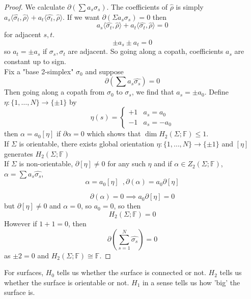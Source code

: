 \documentclass[a4paper,14pt]{extarticle}
\theoremstyle{definition}
\begin{document}
\begin{proof}
We calculate $\partial(\sum a_s\sigma_s)$. The coefficients of $\hat{\rho}$ is simply 
$a_s\langle\hat{\sigma_t},\hat{\rho}\rangle + a_t\langle\hat{\sigma_t},\hat{\rho}\rangle$.
If we want $\partial(\Sigma a_s\sigma_s)=0$ then 
\[a_s\langle\hat{\sigma_t},\hat{\rho}\rangle + a_t\langle\hat{\sigma_t},\hat{\rho}\rangle=0\]
for adjacent $s,t$. \[\pm a_s\pm a_t=0\] so $a_t=\pm a_s$ if $\sigma_s,\sigma_t$ are adjacent.
So going along a copath, coefficients $a_s$ are constant up to sign. \\

Fix a "base 2-simplex" $\sigma_0$ and suppose \[\partial(\sum a_s\hat{\sigma_s})=0\] Then 
going along a copath from $\sigma_0$ to $\sigma_s$, we find that $a_s=\pm a_0$. Define 
$\eta:\{1,\ldots,N\}\rightarrow\{\pm1\}$ by 
\[\eta(s)=\begin{cases}
	+1& a_s=a_0 \\ -1& a_s=-a_0
\end{cases}\]
then $\alpha=a_0[\eta]$ if $\partial\alpha=0$ which shows that $\dim H_2(\Sigma;\mathbb{F})\leq1$. \\

If $\Sigma $ is orientable, there exists global orientation $\eta:\{1,\ldots,N\}\rightarrow
\{\pm 1\}$ and $[\eta]$ generates $H_2(\Sigma;\mathbb{F})$ \\

If $\Sigma$ is non-orientable, $\partial[\eta]\neq0$ for any such $\eta$ and if 
$\alpha\in Z_2(\Sigma;\mathbb{F})$, $\alpha=\sum a_s\hat{\sigma_s}$, \[\alpha=a_0[\eta]
\,\,\,,\partial(\alpha)=a_0\partial[\eta]\]

\[\partial(\alpha)=0\implies a_0\partial[\eta]=0\] but $\partial[\eta]\neq0$ and $\alpha=0$,
so $a_0=0$, so then \[H_2(\Sigma;\mathbb{F})=0\] However if $1+1=0$, then 
\[\partial(\sum_{s=1}^N \hat{\sigma_s})=0\] as $\pm 2=0$ and $H_2(\Sigma;\mathbb{F})\cong
\mathbb{F}$.
\end{proof}

For surfaces, $H_0$ tells us whether the surface is connected or not. $H_2$ tells us
whether the surface is orientable or not. $H_1$ in a sense tells us how 'big' the surface is.

\newpage
\end{document}
